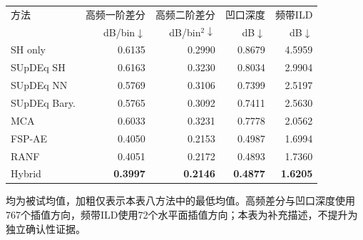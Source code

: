 \begin{table}[htbp]
\centering\small
\setlength{\tabcolsep}{4pt}
\begin{tabular}{lrrrr}
\toprule
方法 & 高频一阶差分 & 高频二阶差分 & 凹口深度 & 频带ILD\\
 & dB/bin$\downarrow$ & dB/bin$^2\downarrow$ & dB$\downarrow$ & dB$\downarrow$\\
\midrule
SH only & 0.6135 & 0.2990 & 0.8679 & 4.5959 \\
SUpDEq SH & 0.6163 & 0.3230 & 0.8034 & 2.9904 \\
SUpDEq NN & 0.5769 & 0.3106 & 0.7399 & 2.5197 \\
SUpDEq Bary. & 0.5765 & 0.3092 & 0.7411 & 2.5630 \\
MCA & 0.6033 & 0.3231 & 0.7778 & 2.0562 \\
FSP-AE & 0.4050 & 0.2153 & 0.4987 & 1.6994 \\
RANF & 0.4051 & 0.2172 & 0.4893 & 1.7360 \\
Hybrid & \textbf{0.3997} & \textbf{0.2146} & \textbf{0.4877} & \textbf{1.6205} \\
\bottomrule
\end{tabular}
\par\smallskip
\parbox{\linewidth}{\footnotesize 均为被试均值，加粗仅表示本表八方法中的最低均值。高频差分与凹口深度使用767个插值方向，频带ILD使用72个水平面插值方向；本表为补充描述，不提升为独立确认性证据。}
\end{table}

